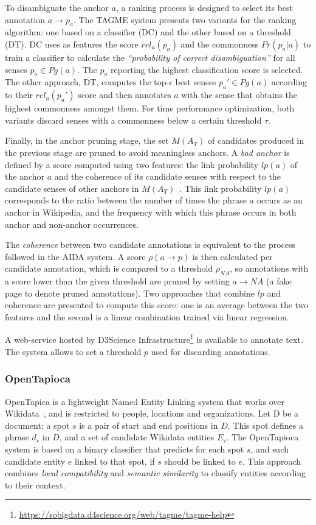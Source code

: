 To disambiguate the anchor $a$, a ranking process is designed to select its best annotation 
$a \rightarrow p_a$. The TAGME system presents two variants for the ranking algorithm: one based 
on a classifier (DC) and the other based on a threshold (DT). DC uses as features the score 
$rel_a(p_a)$ and the commonness $Pr(p_a|a)$ to train a classifier to calculate the 
\textit{“probability of correct disambiguation”} for all senses $p_a \in Pg(a)$. The $p_a$ 
reporting the highest classification score is selected. The other approach, DT, computes the 
top-$\epsilon$ best senses $p_a' \in Pg(a)$ according to their $rel_a(p_a')$ score and then 
annotates $a$ with the sense that obtains the highest commonness amongst them. For time 
performance optimization, both variants discard senses with a commonness below a certain 
threshold $\tau$.

Finally, in the anchor pruning stage, the set $M(A_T)$ of candidates produced in the previous 
stage are pruned to avoid meaningless anchors. A \textit{bad anchor} is defined by a score 
computed using two features: the link probability $lp(a)$ of the anchor $a$ and the coherence of 
its candidate senses with respect to the candidate senses of other anchors in 
$M(A_T)$~\cite{infExtr:MilneW08}. This link probability $lp(a)$ corresponds to the ratio between 
the number of times the phrase $a$ occurs as an anchor in Wikipedia, and the frequency with which 
this phrase occurs in both anchor and non-anchor occurrences.

The \textit{coherence} between two candidate annotations is equivalent to the process followed 
in the AIDA system. A score $\rho(a \rightarrow p)$ is then calculated per candidate annotation, 
which is compared to a threshold $\rho_{NA}$, so annotations with a score lower than the given 
threshold are pruned by setting $a \rightarrow NA$ (a fake page to denote pruned annotations). 
Two approaches that combine $lp$ and coherence are presented to compute this score: one is an 
average between the two features and the second is a linear combination trained via linear 
regression.

A web-service hosted by D3Science Infrastructure\footnote{\url{https://sobigdata.d4science.org/web/tagme/tagme-help}} 
is available to annotate text. The system allows to set a threshold $p$ used for discarding 
annotations.

\subsubsection{OpenTapioca}
\label{cap3:infExtr/entityLinking/openTapioca}
OpenTapica is a lightweight Named Entity Linking system that works over 
Wikidata~\cite{EL:opentapioca-Delpeuch19}, and is restricted to people, locations and 
organizations. Let D be a document; a spot $s$ is a pair of start and end positions in $D$. 
This spot defines a phrase $d_s$ in $D$, and a set of candidate Wikidata entities $E_s$. The 
OpenTapioca system is based on a binary classifier that predicts for each spot $s$, and each 
candidate entity $e$ linked to that spot, if $s$ should be linked to $e$. This approach 
combines \textit{local compatibility} and \textit{semantic similarity} to classify entities 
according to their context.

